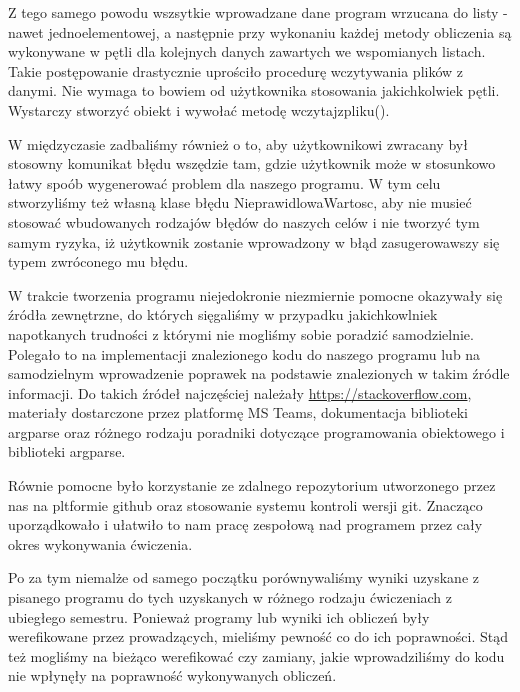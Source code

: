 	Z tego samego powodu wszsytkie wprowadzane dane program wrzucana do listy - nawet jednoelementowej, a następnie przy wykonaniu każdej metody obliczenia są wykonywane w pętli dla kolejnych danych zawartych we wspomianych listach. Takie postępowanie drastycznie uprościło procedurę wczytywania plików z danymi. Nie wymaga to bowiem od użytkownika stosowania jakichkolwiek pętli. Wystarczy stworzyć obiekt i wywołać metodę wczytajzpliku().
	
	W międzyczasie zadbaliśmy również o to, aby użytkownikowi zwracany był stosowny komunikat błędu wszędzie tam, gdzie użytkownik może w stosunkowo łatwy spoób wygenerować problem dla naszego programu. W tym celu stworzyliśmy też własną klase błędu NieprawidlowaWartosc, aby nie musieć stosować wbudowanych rodzajów błędów do naszych celów i nie tworzyć tym samym ryzyka, iż użytkownik zostanie wprowadzony w błąd zasugerowawszy się typem zwróconego mu błędu.
	
	W trakcie tworzenia programu niejedokronie niezmiernie pomocne okazywały się źródła zewnętrzne, do których sięgaliśmy w przypadku jakichkowlniek napotkanych trudności z którymi nie mogliśmy sobie poradzić samodzielnie. Polegało to na implementacji znalezionego kodu do naszego programu lub  na samodzielnym wprowadzenie poprawek na podstawie znalezionych w takim źródle informacji. Do takich źródeł najczęściej należały \url{https://stackoverflow.com}, materiały dostarczone przez platformę MS Teams, dokumentacja biblioteki argparse oraz różnego rodzaju poradniki dotyczące programowania obiektowego i biblioteki argparse.  
	
	Równie pomocne było korzystanie ze zdalnego repozytorium utworzonego przez nas na pltformie github oraz stosowanie systemu kontroli wersji git. Znacząco uporządkowało i ułatwiło to nam pracę zespołową nad programem przez cały okres wykonywania ćwiczenia.
	
	Po za tym niemalże od samego początku porównywaliśmy wyniki uzyskane z pisanego programu do tych uzyskanych w różnego rodzaju ćwiczeniach z ubiegłego semestru. Ponieważ programy lub wyniki ich obliczeń były werefikowane przez prowadzących, mieliśmy pewność co do ich poprawności. Stąd też mogliśmy na bieżąco werefikować czy zamiany, jakie wprowadziliśmy do kodu nie wpłynęły na poprawność wykonywanych obliczeń.
	
	
	

